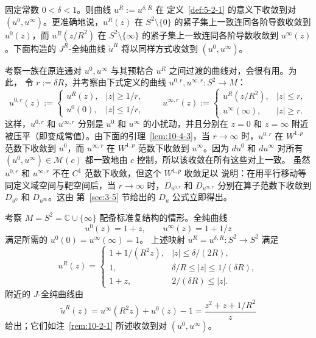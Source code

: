 \begin{remark}\label{rem:10-2-1}
固定常数 $0<\delta<1$。则曲线 $u^R:=u^{\delta,R}$ 在
定义~\ref{def:5-2-1} 的意义下收敛到对 $(u^0,u^\infty)$。更准确地说，$u^R(z)$ 在
$S^2\setminus\{0\}$ 的紧子集上一致连同各阶导数收敛到 $u^0(z)$，而
$u^R(z/R^2)$ 在 $S^2\setminus\{\infty\}$ 的紧子集上一致连同各阶导数收敛到
$u^\infty(z)$。下面构造的 $J^R$-全纯曲线 $\widetilde u^R$ 将以同样方式收敛到
$(u^0,u^\infty)$。
\end{remark}

\begin{remark}\label{rem:10-2-2}
考察一族在原连通对 $u^0,u^\infty$ 与其预粘合 $u^R$ 之间过渡的曲线对，会很有用。为此，
令 $r:=\delta R$，并考察由下式定义的曲线
$u^{0,r},u^{\infty,r}:S^2\to M$：
\[
  u^{0,r}(z):=
  \begin{cases}
    u^R(z),& |z|\ge1/r,\\
    u^0(0),& |z|\le1/r,
  \end{cases}
  \qquad
  u^{\infty,r}(z):=
  \begin{cases}
    u^R(z/R^2),& |z|\le r,\\
    u^\infty(\infty),& |z|\ge r.
  \end{cases}
\]
这样，$u^{0,r}$ 和 $u^{\infty,r}$ 分别是 $u^0$ 和 $u^\infty$ 的小扰动，并且分别在
$z=0$ 和 $z=\infty$ 附近被压平（即变成常值）。由下面的引理~\ref{lem:10-4-3}，当
$r\to\infty$ 时，$u^{0,r}$ 在 $W^{1,p}$ 范数下收敛到 $u^0$，而 $u^{\infty,r}$ 在
$W^{1,p}$ 范数下收敛到 $u^\infty$。因为 $du^0$ 和 $du^\infty$ 对所有
$(u^0,u^\infty)\in\mathcal M(c)$ 都一致地由 $c$ 控制，所以该收敛在所有这些对上一致。
虽然 $u^{0,r}$ 和 $u^{\infty,r}$ 不在 $C^1$ 范数下收敛，但这个 $W^{1,p}$ 收敛足以
说明：在用平行移动等同定义域空间与靶空间后，当 $r\to\infty$ 时，$D_{u^{0,r}}$ 和
$D_{u^{\infty,r}}$ 分别在算子范数下收敛到 $D_{u^0}$ 和 $D_{u^\infty}$。这由
第~\ref{sec:3-5} 节给出的 $D_u$ 公式立即得出。
\end{remark}

\begin{example}\label{ex:10-2-3}
考察 $M=S^2=\mathbb C\cup\{\infty\}$ 配备标准复结构的情形。全纯曲线
\[
  u^0(z)=1+z,
  \qquad
  u^\infty(z)=1+1/z
\]
满足所需的
$u^0(0)=u^\infty(\infty)=1$。
上述映射 $u^R=u^{\delta,R}:S^2\to S^2$ 满足
\[
  u^R(z)=
  \begin{cases}
    1+1/(R^2z),& |z|\le\delta/(2R),\\
    1,& \delta/R\le|z|\le1/(\delta R),\\
    1+z,& 2/(\delta R)\le|z|.
  \end{cases}
\]
附近的 $J$-全纯曲线由
\[
  \widetilde u^R(z)
  =u^\infty(R^2z)+u^0(z)-1
  =\frac{z^2+z+1/R^2}{z}
\]
给出；它们如注~\ref{rem:10-2-1} 所述收敛到对 $(u^0,u^\infty)$。
\end{example}

